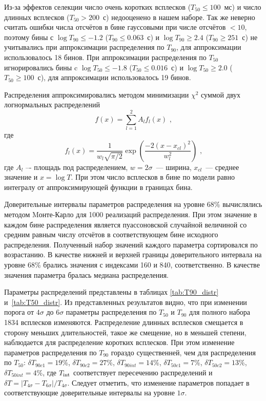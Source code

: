 Из-за эффектов селекции число очень коротких всплесков ($T_{50} \leq 100$~мс) и 
число длинных всплесков ($T_{50} > 200$~с) недооценено в нашем наборе. Так же неверно 
считать ошибки числа отсчётов в бине гауссовыми при числе отсчётов $<10$, поэтому 
бины с $\log T_{90} \leq-1.2$ ($T_{90} \leq 0.063$~с) и $\log T_{90} \geq 2.4$ ($T_{90} \geq 251$~с) 
не учитывались при аппроксимации распределения по $T_{90}$,  для аппроксимации 
использовалось 18 бинов. При аппроксимации распределения по $T_{50}$ игнорировались 
бины c $\log T_{50} \leq -1.8$ ($T_{50} \leq 0.016$~с) и  $\log T_{50} \geq 2.0$ 
($T_{50} \geq 100$~с), для аппроксимации использовалось 19 бинов.

Распределения  аппроксимировались методом минимизации $\chi^2$ суммой двух логнормальных распределений
\begin{equation}
f(x) = \sum_{l=1}^{2} A_l f_l(x) \mbox{ ,}
\end{equation}
где
\begin{equation}
f_l(x) = \frac{1}{w_l \sqrt{\pi/2}} \exp\left(\frac{-2(x-x_{cl})^2}{w_l^2}\right) \mbox{ ,}
\end{equation}
где $A_l$ –- площадь под распределением, $w=2\sigma$~--- ширина, $x_{cl}$~--- среднее значение и 
$x=\log T$. При этом число всплесков в бине по модели равно  интегралу от аппроксимирующей функции в границах бина. 

Доверительные интервалы параметров распределения на уровне 68\% вычислялись 
методом Mонте-Карло для 1000 реализаций распределения. При этом значение в каждом 
бине распределения является пуассоновской случайной величиной со средним равным 
числу отсчётов в соответствующем бине исходного распределения. Полученный набор 
значений каждого параметра сортировался по возрастанию. В качестве нижней и верхней 
границы доверительного интервала на уровне 68\% брались значения с индексами 160 и 840, 
соответственно. В качестве значения параметра бралась медиана распределения.

Параметры распределений представлены в таблицах \ref{tab:T90_distr} и~\ref{tab:T50_distr}. 
Из представленных результатов видно, что при изменении порога от $4\sigma$ до $6\sigma$ 
параметры распределения по $T_{50}$ и $T_{90}$ для полного набора 1834 всплесков изменяются. 
Распределение длинных всплесков смещается в сторону меньших длительностей, такое же смещение, 
но в меньшей степени, наблюдается для распределение коротких всплесков. 
При этом изменение параметров распределения по $T_{90}$ гораздо существенней, 
чем для распределения по $T_{50}$: 
$\delta T_{90c1} = 19$\%, $\delta T_{90c2} = 27$\%, $\delta T_{90int} = 14$\%, 
$\delta T_{50c1} = 7$\%, $\delta T_{50c2} = 13$\%, $\delta T_{50int} = 4$\%, 
где $T_{{\mathrm{int}}}$ соответствует пересечению распределений и 
$\delta T =|T_{4\sigma}-T_{6\sigma}| / T_{4\sigma}$. 
Следует отметить, что изменение параметров попадает в соответствующие доверительные интервалы на уровне $1\sigma$. 

